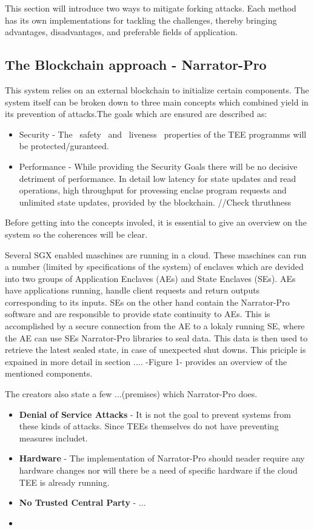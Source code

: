  
 This section will introduce two ways to mitigate forking attacks. Each method has its own implementations for tackling the challenges, thereby bringing advantages, disadvantages, and preferable fields of application.

\subsection{The Blockchain approach - Narrator-Pro}

This system relies on an external blockchain to initialize certain components. The system itself can be broken down to three main concepts which combined yield in its prevention of attacks.The goals which are ensured are described as:
\begin{itemize}
    \item Security - The ~safety~ and ~liveness~ properties of the TEE programms will be protected/guranteed.
    \item Performance -  While providing the Security Goals there will be no decisive detriment of performance. In detail low latency for state updates and read operations, high throughput for provessing enclae program requests and unlimited state updates, provided by the blockchain. //Check thruthness
\end{itemize} 
Before getting into the concepts involed, it is essential to give an overview on the system so the coherences will be clear.

Several SGX enabled maschines are running in a cloud. These maschines can run a number (limited by specifications of the system) of enclaves which are devided into two groups of Application Enclaves (AEs) and State Enclaves (SEs). AEs have applications running, handle client requests and return outputs corresponding to its inputs. SEs on the other hand contain the Narrator-Pro software and are responsible to provide state continuity to AEs. This is accomplished by a secure connection from the AE to a lokaly running SE, where the AE can use SEs Narrator-Pro libraries to seal data. This data is then used to retrieve the latest sealed state, in case of unexpected shut downs. This priciple is expained in more detail in section .... -Figure 1- provides an overview of the mentioned components.

The creators also state a few ...(premises) which Narrator-Pro does. 
\begin{itemize}
    \item \textbf{Denial of Service Attacks} - It is not the goal to prevent systems from these kinds of attacks. Since TEEs themselves do not have preventing measures includet. 
    \item \textbf{Hardware} - The implementation of Narrator-Pro should neader require any hardware changes nor will there be a need of specific hardware if the cloud TEE is already running. 
    \item \textbf{No Trusted Central Party} - ... 
    \item \textbf{}
\end{itemize} 

